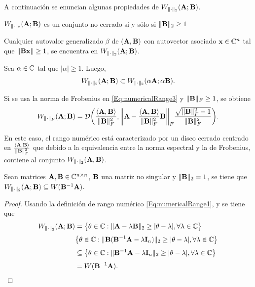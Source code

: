 		A continuación se enuncian algunas propiedades de $W_{\|\cdot\|_2}(\mathbf{A};\mathbf{B})$.
		
		\begin{prop}
			$W_{\|\cdot\|_2}(\mathbf{A};\mathbf{B})$ es un conjunto no cerrado si y sólo si $\|\mathbf{B}\|_2\ge1$
		\end{prop}
		\begin{prop}
			Cualquier autovalor generalizado $\beta$ de $(\mathbf{A},\mathbf{B})$ con autovector asociado $\mathbf{x}\in\mathbb{C}^n$ tal que $\|\mathbf{B}\mathbf{x}\|\ge 1$, se encuentra en $W_{\|\cdot\|_2}(\mathbf{A};\mathbf{B})$.
		\end{prop}
		
		\begin{prop}
			Sea $\alpha\in\mathbb{C}$ tal que $|\alpha|\ge 1$. Luego,
			\[W_{\|\cdot\|_2}(\mathbf{A};\mathbf{B})\subset W_{\|\cdot\|_2}(\alpha\mathbf{A};\alpha\mathbf{B}).\]
		\end{prop}
		
		\begin{prop}\label{Prop:numericalRange}
			Si se usa la norma de Frobenius en \eqref{Eq:numericalRange3} y $\|\mathbf{B}\|_F\ge 1$, se obtiene
			\begin{equation}
				W_{\|\cdot\|_F}(\mathbf{A};\mathbf{B}) = \mathcal{D}\bigg(\frac{\langle\mathbf{A},\mathbf{B}\rangle}{\|\mathbf{B}\|_F^2}, \bigg\|\mathbf{A} - \frac{\langle\mathbf{A},\mathbf{B}\rangle}{\|\mathbf{B}\|_F^2}\mathbf{B}\bigg\|_F\frac{\sqrt{\|\mathbf{B}\|_F^2-1}}{\|\mathbf{B}\|_F^2}\bigg).
				\label{Eq:numericalRange5}
			\end{equation}
		\end{prop}
		En este caso, el rango numérico está caracterizado por un disco cerrado centrado en $\frac{\langle\mathbf{A},\mathbf{B}\rangle}{\|\mathbf{B}\|_F^2}$ que debido a la equivalencia entre la norma espectral y la de Frobenius, contiene al conjunto $W_{\|\cdot\|_2}(\mathbf{A},
		\mathbf{B})$.
		
		\begin{lemma}\label{Lemma:NumericalRange1} %
			Sean matrices $\mathbf{A},\mathbf{B}\in\mathbb{C}^{n\times n}$, $\mathbf{B}$ una matriz no singular y $\|\mathbf{B}\|_2=1$, se tiene que $W_{\|\cdot\|_2}(\mathbf{A};\mathbf{B}) \subseteq W(\mathbf{B}^{-1}\mathbf{A})$.
		\end{lemma}
		\begin{proof}
			Usando la definición de rango numérico \eqref{Eq:numericalRange1}, y se tiene que
			\[\begin{aligned}
				W_{\|\cdot\|_2}(\mathbf{A};\mathbf{B}) & = \big\{\theta\in\mathbb{C}:\|\mathbf{A}-\lambda\mathbf{B}\|_2\ge|\theta-\lambda|,\forall\lambda\in\mathbb{C}\big\}\\[0.3em]
				&  \big\{\theta\in\mathbb{C}:\|\mathbf{B}(\mathbf{B}^{-1}\mathbf{A}-\lambda\mathbf{I}_n)\|_2\ge|\theta-\lambda|,\forall\lambda\in\mathbb{C}\big\}\\[0.3em]
				& \subseteq \big\{\theta\in\mathbb{C}:\|\mathbf{B}^{-1}\mathbf{A}-\lambda\mathbf{I}_n\|_2\ge|\theta-\lambda|,\forall\lambda\in\mathbb{C}\big\}\\[0.3em]
				& = W(\mathbf{B}^{-1}\mathbf{A}).
			\end{aligned}\]
		\end{proof}
		
